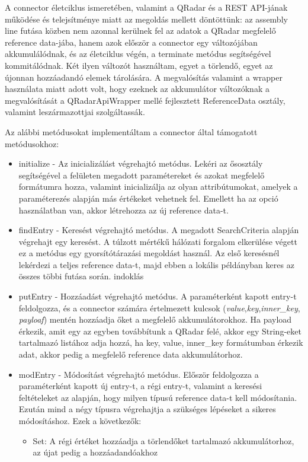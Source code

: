 A connector életciklus ismeretében, valamint a QRadar és a REST API-jának működése és telejsítménye miatt az megoldás mellett döntöttünk: az assembly line futása közben nem azonnal kerülnek fel az adatok a QRadar megfelelő reference data-jába, hanem azok először a connector egy változójában akkumulálódnak, és az életciklus végén, a terminate metódus segítségével kommitálódnak. Két ilyen változót használtam, egyet a törlendő, egyet az újonnan hozzáadandó elemek tárolására. A megvalósítás valamint a wrapper használata miatt adott volt, hogy ezeknek az akkumulátor változóknak a megvalósítását a QRadarApiWrapper mellé fejlesztett ReferenceData osztály, valamint leszármazottjai szolgáltassák.

Az alábbi metódusokat implementáltam a connector által támogatott metódusokhoz:

\begin{itemize}
	\item initialize - Az inicializálást végrehajtó metódus. Lekéri az ősosztály segítségével a felületen megadott paramétereket és azokat megfelelő formátumra hozza, valamint inicializálja az olyan attribútumokat, amelyek a paraméterezés alapján más értékeket vehetnek fel. Emellett ha az opció használatban van, akkor létrehozza az új reference data-t.
	
	\item findEntry - Keresést végrehajtó metódus. A megadott SearchCriteria alapján végrehajt egy keresést. A túlzott mértékű hálózati forgalom elkerülése végett ez a metódus egy gyorsítótárazási megoldást használ. Az első keresésnél lekérdezi a teljes reference data-t, majd ebben a lokális példányban keres az összes többi futása során. \todo indoklás
	
	\item  putEntry - Hozzáadást végrehajtó metódus. A paraméterként kapott entry-t feldolgozza, és a connector számára értelmezett kulcsok (\textit{value},\textit{key},\textit{inner\_key}, \textit{payloaf}) mentén hozzáadja őket a megfelelő akkumulátorokhoz. Ha payload érkezik, amit egy az egyben továbbítunk a QRadar felé, akkor egy String-eket tartalmazó listához adja hozzá, ha key, value, inner\_key formátumban érkezik adat, akkor pedig a megfelelő reference data akkumulátorhoz.
	
	\item modEntry - Módosítást végrehajtó metódus. Először feldolgozza a paraméterként kapott új entry-t, a régi entry-t, valamint a keresési feltételeket az alapján, hogy milyen típusú reference data-t kell módosítania. Ezután mind a négy típusra végrehajtja a szükséges lépéseket a sikeres módosításhoz. Ezek a következők:
	\begin{itemize}
		\item Set: A régi értéket hozzáadja a törlendőket tartalmazó akkumulátorhoz, az újat pedig a hozzáadandóakhoz
		

\end{itemize}
\end{itemize}

